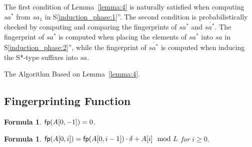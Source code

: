 \documentclass[10pt,journal,compsoc]{IEEEtran}
\newtheorem{formula}[theorem]{Formula}
\begin{document}
The first condition of Lemma~\ref{lemma:4} is naturally satisfied when computing $sa^*$ from $sa_1$ in S\ref{induction_phase:1}''. The second condition is probabilistically checked by computing and comparing the fingerprints of $sa^*$ and $\overline{sa^*}$. The fingerprint of $sa^*$ is computed when placing the elements of $sa^*$ into $sa$ in S\ref{induction_phase:2}'', while the fingerprint of $\overline{sa^*}$ is computed when inducing the S*-type suffixes into $sa$.


\begin{algorithm*}

	\caption{The Algorithm Based on Lemma~\ref{lemma:4}.}
	
	\label{alg:3}
	
\end{algorithm*}


\subsection{Fingerprinting Function}

\begin{formula} \label{formula:1}${\sf fp}(A[0, -1]) = 0$.
\end{formula}

\begin{formula} \label{formula:2}${\sf fp}(A[0, i]) = {\sf fp}(A[0, i - 1]) \cdot {\delta} + A[i]\mod L$ for $i \ge 0$.
\end{formula}
\end{document}
